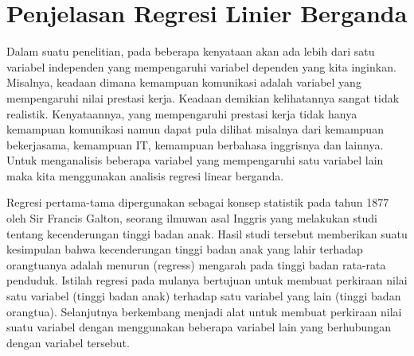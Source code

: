 \section{Penjelasan Regresi Linier Berganda}
\par Dalam suatu penelitian, pada beberapa kenyataan akan ada lebih dari satu variabel independen yang mempengaruhi variabel dependen yang kita inginkan. Misalnya, keadaan dimana kemampuan komunikasi adalah variabel yang mempengaruhi nilai prestasi kerja. Keadaan demikian kelihatannya sangat tidak realistik. Kenyataannya, yang mempengaruhi prestasi kerja tidak hanya kemampuan komunikasi namun dapat pula dilihat misalnya dari kemampuan bekerjasama, kemampuan IT, kemampuan berbahasa inggrisnya dan lainnya. Untuk menganalisis beberapa variabel yang mempengaruhi satu variabel lain maka kita menggunakan analisis regresi linear berganda.      
\par Regresi pertama-tama dipergunakan sebagai konsep statistik pada tahun 1877 oleh Sir Francis Galton, seorang ilmuwan asal Inggris yang melakukan studi tentang kecenderungan tinggi badan anak. Hasil studi tersebut memberikan suatu kesimpulan bahwa kecenderungan tinggi badan anak yang lahir terhadap orangtuanya adalah menurun (regress) mengarah pada tinggi badan rata-rata penduduk. Istilah regresi pada mulanya bertujuan untuk membuat perkiraan nilai satu variabel (tinggi badan anak) terhadap satu variabel yang lain (tinggi badan orangtua). Selanjutnya berkembang menjadi alat untuk membuat perkiraan nilai suatu variabel dengan menggunakan beberapa variabel lain yang berhubungan dengan variabel tersebut. 


